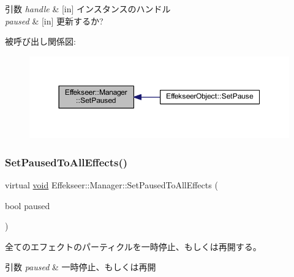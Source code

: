 \begin{DoxyParams}{引数}
{\em handle} & \mbox{[}in\mbox{]} インスタンスのハンドル \\
\hline
{\em paused} & \mbox{[}in\mbox{]} 更新するか? \\
\hline
\end{DoxyParams}
被呼び出し関係図\+:\nopagebreak
\begin{figure}[H]
\begin{center}
\leavevmode
\includegraphics[width=350pt]{class_effekseer_1_1_manager_a6414ea849302b7cef51b61a38c7ecd76_icgraph}
\end{center}
\end{figure}
\mbox{\label{class_effekseer_1_1_manager_a08c4c39a56fcc93b8acb284ff9bc933b}} 
\subsubsection{\texorpdfstring{Set\+Paused\+To\+All\+Effects()}{SetPausedToAllEffects()}}
{\footnotesize\ttfamily virtual \mbox{\hyperlink{namespace_effekseer_ab34c4088e512200cf4c2716f168deb56}{void}} Effekseer\+::\+Manager\+::\+Set\+Paused\+To\+All\+Effects (\begin{DoxyParamCaption}\item[{bool}]{paused }\end{DoxyParamCaption})\hspace{0.3cm}{\ttfamily [pure virtual]}}



全てのエフェクトのパーティクルを一時停止、もしくは再開する。 


\begin{DoxyParams}{引数}
{\em paused} & 一時停止、もしくは再開 \\
\hline
\end{DoxyParams}
\mbox{\label{class_effekseer_1_1_manager_acff5857772ae9674b6f96ffd4de28f69}} 
